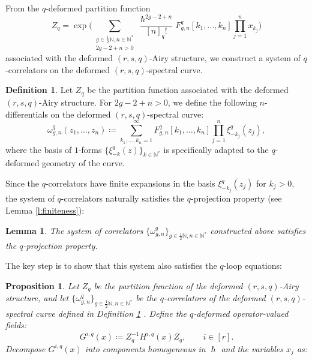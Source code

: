 \documentclass[reqno,11pt]{amsart}
\theoremstyle{plain}
\newtheorem{proposition}[theorem]{Proposition}
\newtheorem{lemma}[theorem]{Lemma}
\theoremstyle{definition}
\newtheorem{definition}[theorem]{Definition}
\theoremstyle{remark}
\numberwithin{equation}{section}
\newcommand{\mb}[1]{\mathbb{#1}}
\newcommand{\1}{\mathds{1}}
\newcommand{\N}{\mb{N}}
\newcommand{\2}{\frac{1}{2}}
\begin{document}
{								From the  $q$-deformed partition function
								\begin{equation}
									Z_q = \exp \bigg( \sum_{ \substack{g \in \frac{1}{2} \N, n \in \N^* \\ 2g-2 + n > 0}} \frac{\hslash^{2g-2+n}}{[n]_q!} F^{q}_{g,n}[k_1, \dotsc, k_n] \prod_{j=1}^n x_{k_j} \bigg)
								\end{equation} 
								associated with the deformed $(r,s,q)$-Airy structure, we construct a system of $q$-correlators on the deformed $(r,s,q)$-spectral curve.
								\begin{definition}\label{d:srs}
									Let $Z_q$ be the partition function associated with the deformed $(r,s,q)$-Airy structure. For $2g-2+n>0$, we define the following  $n$-differentials on the deformed $(r,s,q)$-spectral curve:
									\begin{equation}
										\omega^{q}_{g,n} (z_1, \dotsc, z_n ) \coloneqq \sum_{k_1, \dotsc, k_n = 1}^\infty F^{q}_{g,n}[k_1, \dotsc, k_n] \prod_{j=1}^n \xi^q_{-k_j} (z_j),
									\end{equation}
									where the basis of $1$-forms $\{\xi^q_{-k} (z)\}_{k\in \N^*}$ is specifically adapted to the $q$-deformed geometry of the curve.
								\end{definition}
								Since the $q$-correlators have finite expansions in the basis $\xi^q_{-k_j}(z_j)$ for $k_j >0$, the system of $q$-correlators naturally satisfies the $q$-projection property (see Lemma \ref{l:finiteness}):
								\begin{lemma}\label{l:projprop}
									The system of correlators $\{\omega^{q}_{g,n} \}_{g \in \frac{1}{2}\mathbb{N}, n \in \mathbb{N}^*}$ constructed above satisfies the $q$-projection property.
								\end{lemma}
								The key step is to show that this system also satisfies the $q$-loop equations:
								\begin{proposition}\label{p:loopeq}
									Let $Z_q$ be the partition function of the deformed $(r,s,q)$-Airy structure, and let  $\{\omega^{q}_{g,n} \}_{g \in \frac{1}{2}\mathbb{N}, n \in \mathbb{N}^*}$ be the $q$-correlators of the deformed $(r,s,q)$-spectral curve defined in Definition \ref{d:srs} . Define the $q$-deformed  operator-valued fields:
									\begin{equation}
										G^{i,q}(x) \coloneqq Z_q^{-1} H^{i,q}(x) Z_q, \qquad i \in [r].
									\end{equation}
									Decompose  $G^{i,q}(x)$ into components homogeneous in $\hslash$ and the variables $ x_j$ as:

\end{proposition}}
\end{document}

